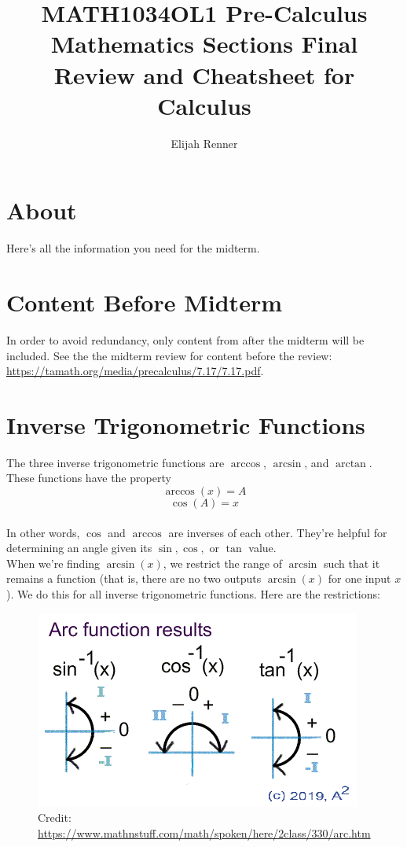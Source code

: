 \documentclass[12pt]{article}
\title{MATH1034OL1 Pre-Calculus Mathematics Sections Final Review and Cheatsheet for Calculus}
\author{Elijah Renner}
\begin{document}
\maketitle

\vspace{0.5in}

\tableofcontents

\section{About}

Here's all the information you need for the midterm. \\

\section{Content Before Midterm}

In order to avoid redundancy, only content from after the midterm will be included. See the the midterm review for content before the review: \url{https://tamath.org/media/precalculus/7.17/7.17.pdf}.\\

\section{Inverse Trigonometric Functions}

The three inverse trigonometric functions are \(\arccos\), \(\arcsin\), and \(\arctan\). These functions have the property\\

\[\arccos(x)=A\]
\[\cos(A)=x\]\\

In other words, \(\cos\) and \(\arccos\) are inverses of each other. They're helpful for determining an angle given its \(\sin, \cos,\) or \(\tan\) value.\\

When we're finding \(\arcsin(x)\), we restrict the range of \(\arcsin\) such that it remains a function (that is, there are no two outputs \(\arcsin(x)\) for one input \(x\)). We do this for all inverse trigonometric functions. Here are the restrictions:\\

\begin{figure}[H]
	\centering
	\includegraphics[scale=0.6]{arcf.gif}
	\caption{Credit: \url{https://www.mathnstuff.com/math/spoken/here/2class/330/arc.htm}}
\end{figure}
\end{document}
